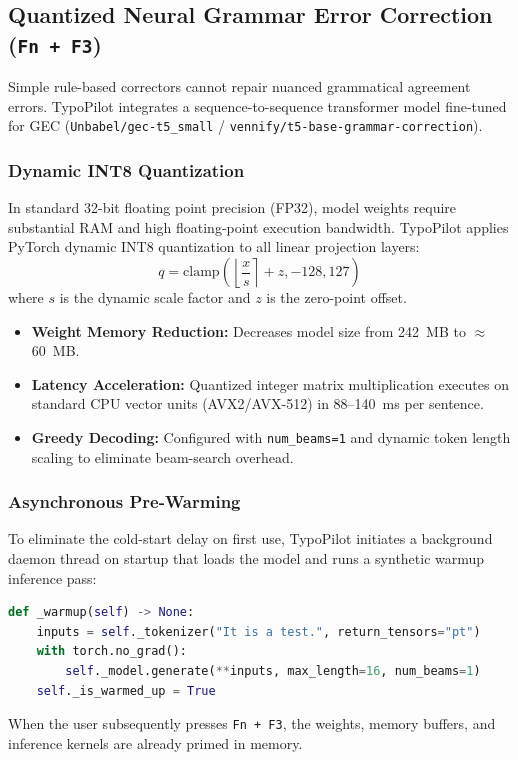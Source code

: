\documentclass[11pt,a4paper]{article}
\begin{document}
\subsection{Quantized Neural Grammar Error Correction (\texttt{Fn + F3})}
Simple rule-based correctors cannot repair nuanced grammatical agreement errors. TypoPilot integrates a sequence-to-sequence transformer model fine-tuned for GEC (\texttt{Unbabel/gec-t5\_small} / \texttt{vennify/t5-base-grammar-correction}).

\subsubsection{Dynamic INT8 Quantization}
In standard 32-bit floating point precision (FP32), model weights require substantial RAM and high floating-point execution bandwidth. TypoPilot applies PyTorch dynamic INT8 quantization to all linear projection layers:
\begin{equation}
    q = \text{clamp}\left( \left\lfloor \frac{x}{s} \right\rceil + z, -128, 127 \right)
\end{equation}
where $s$ is the dynamic scale factor and $z$ is the zero-point offset.
\begin{itemize}
    \item \textbf{Weight Memory Reduction:} Decreases model size from 242~MB to $\approx$ 60~MB.
    \item \textbf{Latency Acceleration:} Quantized integer matrix multiplication executes on standard CPU vector units (AVX2/AVX-512) in 88--140~ms per sentence.
    \item \textbf{Greedy Decoding:} Configured with \texttt{num\_beams=1} and dynamic token length scaling to eliminate beam-search overhead.
\end{itemize}

\subsubsection{Asynchronous Pre-Warming}
To eliminate the cold-start delay on first use, TypoPilot initiates a background daemon thread on startup that loads the model and runs a synthetic warmup inference pass:
\begin{lstlisting}[language=Python]
def _warmup(self) -> None:
    inputs = self._tokenizer("It is a test.", return_tensors="pt")
    with torch.no_grad():
        self._model.generate(**inputs, max_length=16, num_beams=1)
    self._is_warmed_up = True
\end{lstlisting}
When the user subsequently presses \texttt{Fn + F3}, the weights, memory buffers, and inference kernels are already primed in memory.
\end{document}
